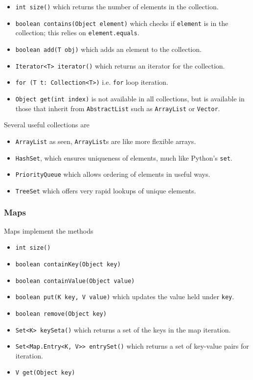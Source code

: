 \documentclass[12pt]{report}
\newcommand{\code}[1]{\lstinline{#1}}
\begin{document}
\begin{flushleft}
\begin{itemize}
    \item \code{int size()} which returns the number of elements in the
        collection.
    \item \code{boolean contains(Object element)} which checks if
        \code{element} is in the collection; this relies on
        \code{element.equals}.
    \item \code{boolean add(T obj)} which adds an element to the collection.
    \item \code{Iterator<T> iterator()} which returns an iterator for the
        collection.
    \item \code{for (T t: Collection<T>)} i.e. \code{for} loop iteration.
    \item \code{Object get(int index)} is not available in all collections, but
        is available in those that inherit from \code{AbstractList} such as
        \code{ArrayList} or \code{Vector}.
\end{itemize}

Several useful collections are

\begin{itemize}
    \item \code{ArrayList} as seen, \code{ArrayList}s are like more flexible
        arrays.
    \item \code{HashSet}, which ensures uniqueness of elements, much like
        Python's \code{set}.
    \item \code{PriorityQueue} which allows ordering of elements in useful
        ways.
    \item \code{TreeSet} which offers very rapid lookups of unique elements.
\end{itemize}

\subsubsection*{Maps}

Maps implement the methods

\begin{itemize}
    \item \code{int size()}
    \item \code{boolean containKey(Object key)}
    \item \code{boolean containValue(Object value)}
    \item \code{boolean put(K key, V value)} which updates the value held under
        \code{key}.
    \item \code{boolean remove(Object key)}
    \item \code{Set<K> keySeta()} which returns a set of the keys in the map
        iteration.
    \item \code{Set<Map.Entry<K, V>> entrySet()} which returns a set of
        key-value pairs for iteration.
    \item \code{V get(Object key)}
\end{itemize}


\end{flushleft}
\end{document}
